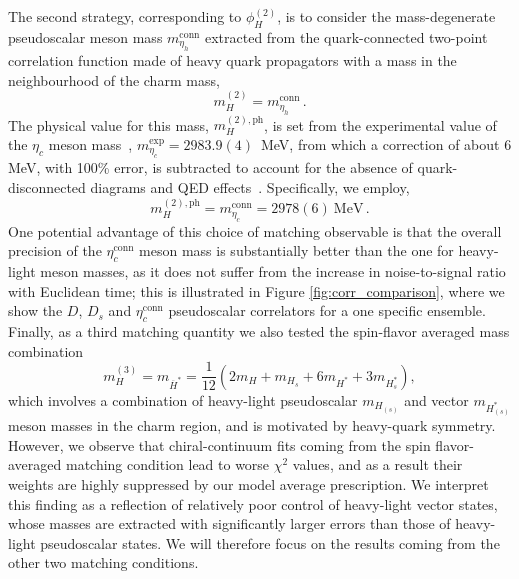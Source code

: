 The second strategy, corresponding to $\phi_H^{(2)}$, is to consider the mass-degenerate pseudoscalar meson mass $m_{\eta_h}^{\mathrm{conn}}$ extracted from the quark-connected two-point correlation function made of heavy quark propagators with a mass in the neighbourhood of the charm mass,
%
\begin{equation}
  m_H^{(2)} = m_{\eta_h}^{\mathrm{conn}}\,.
\label{eq:etac_matching}
\end{equation}
%
The physical value for this mass, $m_H^{(2), \mathrm{ph}}$,  is set from the experimental value of the $\eta_c$ meson mass~\cite{ParticleDataGroup:2022pth}, $m_{\eta_c}^{\mathrm{exp}} = 2983.9(4)\,$ MeV, from which a correction of about 6 MeV, with 100\% error, is subtracted to account for the absence of quark-disconnected diagrams and QED effects~\cite{deForcrand:2004ia, Donald:2012ga,Colquhoun:2015oha,Hatton:2020qhk,Colquhoun:2023zbc}. Specifically, we employ, 
%
\begin{equation}
  m_H^{(2), \mathrm{ph}} = m_{\eta_c}^{\mathrm{conn}} = 2978(6) \ \mathrm{MeV}\,.
\end{equation}
%
One potential advantage of this choice of matching observable is that the overall precision of the $\eta_c^{\mathrm{conn}}$ meson mass is substantially better than the one for heavy-light meson masses, as it does not suffer from the increase in noise-to-signal ratio with Euclidean time; this is illustrated in Figure \ref{fig:corr_comparison}, where we show the $D$, $D_s$ and $\eta_c^{\mathrm{conn}}$ pseudoscalar correlators for a one specific ensemble.
%
Finally, as a third matching quantity we also tested the spin-flavor averaged mass combination
\begin{equation}
 	m_H^{(3)} = m_{\overline{H}^*} = \frac{1}{12} \left(
 	2m_H + m_{H_s} + 6 m_{H^*} + 3 m_{H_s^*}
 	\right),
\label{eq:spin_flavor_av}
\end{equation}
which involves a combination of heavy-light pseudoscalar  $m_{H_{(s)}}$ and vector  $m_{H_{(s)}^*}$ meson masses in the charm region, and is motivated by heavy-quark symmetry. However, we observe that chiral-continuum fits coming from the spin flavor-averaged matching condition lead to worse $\chi^2$ values, and as a result their weights are highly suppressed by  our model average prescription. We interpret this finding as a reflection of relatively poor control of heavy-light vector states, whose masses are extracted with significantly larger errors than those of heavy-light pseudoscalar states. We will therefore focus on the results coming from the other two matching conditions.
%

